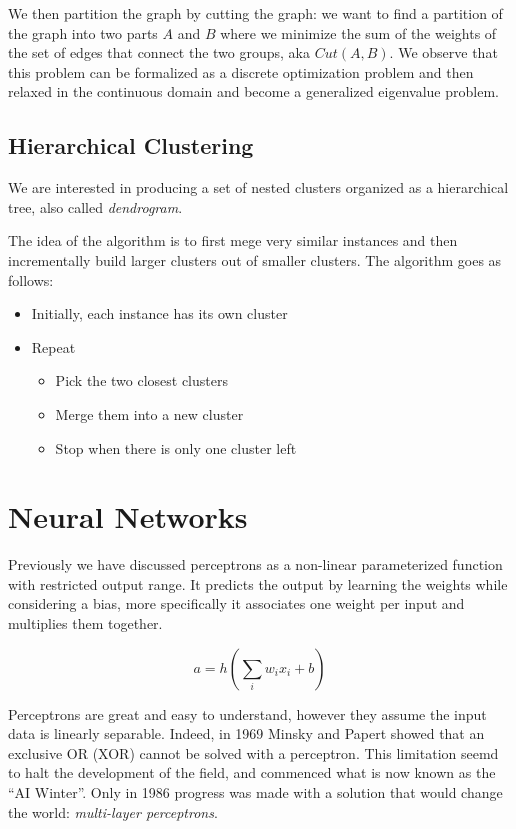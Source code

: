 \documentclass[11pt]{article}
\begin{document}
We then partition the graph by cutting the graph: we want to find a
partition of the graph into two parts \(A\) and \(B\) where we minimize
the sum of the weights of the set of edges that connect the two groups,
aka \(Cut(A, B)\). We observe that this problem can be formalized as a
discrete optimization problem and then relaxed in the continuous domain
and become a generalized eigenvalue problem.

\subsection{Hierarchical Clustering}\label{hierarchical-clustering}

We are interested in producing a set of nested clusters organized as a
hierarchical tree, also called \emph{dendrogram}.

The idea of the algorithm is to first mege very similar instances and
then incrementally build larger clusters out of smaller clusters. The
algorithm goes as follows:

\begin{itemize}
\tightlist
\item
  Initially, each instance has its own cluster
\item
  Repeat

  \begin{itemize}
  \tightlist
  \item
    Pick the two closest clusters
  \item
    Merge them into a new cluster
  \item
    Stop when there is only one cluster left
  \end{itemize}
\end{itemize}

\section{Neural Networks}\label{neural-networks}

Previously we have discussed perceptrons as a non-linear parameterized
function with restricted output range. It predicts the output by
learning the weights while considering a bias, more specifically it
associates one weight per input and multiplies them together.

\[a=h(\sum_i w_ix_i+b)\]

Perceptrons are great and easy to understand, however they assume the
input data is linearly separable. Indeed, in 1969 Minsky and Papert
showed that an exclusive OR (XOR) cannot be solved with a perceptron.
This limitation seemd to halt the development of the field, and
commenced what is now known as the ``AI Winter''. Only in 1986 progress
was made with a solution that would change the world: \emph{multi-layer
perceptrons}.
\end{document}
